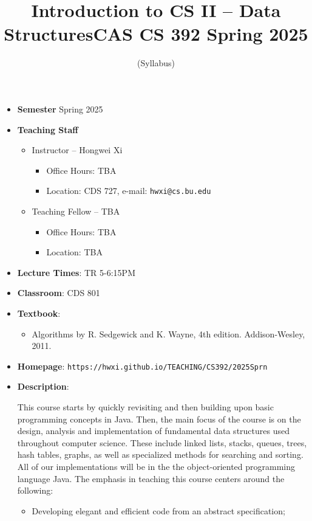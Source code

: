 \documentclass[11pt]{article}
\title{Introduction to CS II -- Data Structures\break CAS CS 392 Spring 2025}
\author{(Syllabus)}
\date{}
\begin{document}
\maketitle
\thispagestyle{empty}

\begin{itemize}
\item {\bf Semester} Spring 2025
\item {\bf Teaching Staff}
\begin{itemize}
\item
Instructor -- Hongwei Xi
\begin{itemize}
\item
Office Hours: TBA
\item
Location: CDS 727, e-mail: \texttt{hwxi@cs.bu.edu}
\end{itemize}

\item
Teaching Fellow -- TBA
\begin{itemize}
\item
Office Hours: TBA
\item
Location: TBA
\end{itemize}
\end{itemize}

\item {\bf Lecture Times}: TR 5-6:15PM
\item {\bf Classroom}: CDS 801
\item {\bf Textbook}:\kern6pt
\begin{itemize}
\item
Algorithms by R. Sedgewick and K. Wayne, 4th edition. Addison-Wesley, 2011.
\end{itemize}

\item {\bf Homepage}:
{\tt  https://hwxi.github.io/TEACHING/CS392/2025Sprn}

\item {\bf Description}:

This course starts by quickly revisiting and then building upon basic
programming concepts in Java. Then, the main focus of the course is on
the design, analysis and implementation of fundamental data structures
used throughout computer science. These include linked lists, stacks,
queues, trees, hash tables, graphs, as well as specialized methods for
searching and sorting. All of our implementations will be in the the
object-oriented programming language Java. The emphasis in teaching
this course centers around the following:

\begin{itemize}
\item
Developing elegant and efficient code from an abstract specification;


\end{itemize}
\end{itemize}
\end{document}
